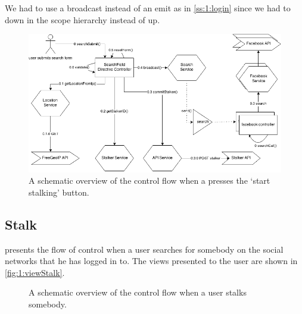 	We had to use a broadcast instead of an emit as in \cref{ss:1:login} since we had to down in the scope hierarchy instead of up. 

		\begin{figure}
			\includegraphics[width=\textwidth]{./img/1_start_stalking_flow}
			\caption{A schematic overview of the control flow when a presses the `start stalking' button.}
			\label{fig:1:controlflowStartStalk}
		\end{figure}


\subsection{Stalk}
	 presents the flow of control when a user searches for somebody on the social networks that he has logged in to. The views presented to the user are shown in \autoref{fig:1:viewStalk}.


		\begin{figure}
			\caption{A schematic overview of the control flow when a user stalks somebody.}
			\label{fig:1:controlflowStalk}
		\end{figure}	

